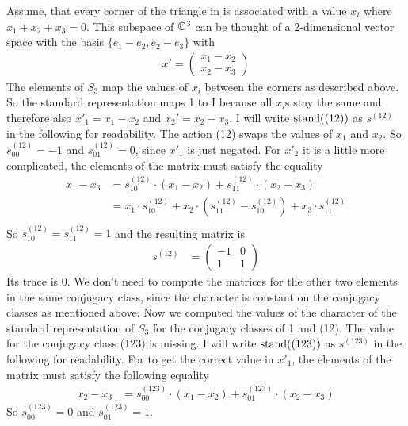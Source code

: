 Assume, that every corner of the triangle in  is associated with a value $x_i$ where $x_1 + x_2 + x_3 = 0$.
This subspace of $\mathbb{C}^3$ can be thought of a 2-dimensional vector space with the basis $\{e_1 - e_2, e_2 - e_3\}$ with
\begin{align*}
    x' = \begin{pmatrix}
        x_1 - x_2 \\
        x_2 - x_3
    \end{pmatrix}
\end{align*}
The elements of $S_3$ map the values of $x_i$ between the corners as described above.
So the standard representation maps 1 to I because all $x_i$s stay the same and therefore also $x'_1 = x_1 - x_2$ and $x_2' = x_2 - x_3$.
I will write $\operatorname{stand}((12))$ as $s^{(12)}$ in the following for readability.
The action (12) swaps the values of $x_1$ and $x_2$.
So $s^{(12)}_{00} = -1$ and $s^{(12)}_{01} = 0$, since $x'_1$ is just negated.
For $x'_2$ it is a little more complicated, the elements of the matrix must satisfy the equality
\begin{align*}
    x_1 - x_3 & = s^{(12)}_{10} \cdot (x_1 - x_2) + s^{(12)}_{11} \cdot (x_2 - x_3) \\
    & = x_1 \cdot s^{(12)}_{10} + x_2 \cdot (s^{(12)}_{11} - s^{(12)}_{10}) + x_3 \cdot s^{(12)}_{11} \\
\end{align*}
So $s^{(12)}_{10} = s^{(12)}_{11} = 1$ and the resulting matrix is
\begin{align*}
    s^{(12)} & = \begin{pmatrix}
        -1 & 0 \\
        1 & 1
    \end{pmatrix}
\end{align*}
Its trace is 0.
We don't need to compute the matrices for the other two elements in the same conjugacy class, since the character is constant on the conjugacy classes as mentioned above.
Now we computed the values of the character of the standard representation of $S_3$ for the conjugacy classes of 1 and (12).
The value for the conjugacy class (123) is missing.
I will write $\operatorname{stand}((123))$ as $s^{(123)}$ in the following for readability.
For to get the correct value in $x'_1$, the elements of the matrix must satisfy the following equality
\begin{align*}
    x_2 - x_3 & = s^{(123)}_{00} \cdot (x_1 - x_2) + s^{(123)}_{01} \cdot (x_2 - x_3)
\end{align*}
So $s^{(123)}_{00} = 0$ and $s^{(123)}_{01} = 1$.
